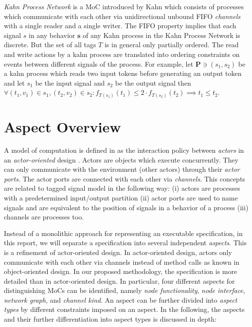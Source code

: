 \emph{Kahn Process Network} is a MoC introduced by Kahn \cite{kahn:1974}
which consists of processes which communicate with each other via
unidirectional unbound FIFO \emph{channels} with a  single reader and
a single writer. The FIFO property implies that each signal $s$ in any
behavior $\mathbf{s}$ of any Kahn process in the Kahn Process Network
is discrete.
But the set of all tags $T$ is in general only partially ordered.
The read and write actions by a kahn process are translated into
ordering constraints on events between different signals of the process.
For example, let $\mathbf{P} \ni (s_1,s_2)$ be a kahn process
which reads two input tokens before generating an output token and
let $s_1$ be the input signal and $s_2$ be the output signal then
$\forall{(t_1,v_1) \in s_1, (t_2,v_2) \in s_2}: f_{T(s_1)}(t_1) \le 2 \cdot f_{T(s_2)}(t_2) \implies t_1 \le t_2$.




\section{Aspect Overview}\label{aspect-overview}

A model of computation is defined in \cite{embsft:2002} as the
interaction policy between \emph{actors} in an \emph{actor-oriented} design
\cite{agha97abstracting:1997}. Actors are objects which execute concurrently. They can only
communicate with the environment (other actors) through their \emph{actor ports}.
The actor ports are connected with each other via \emph{channels}.
This concepts are related to tagged signal model in the following way:
(i) actors are processes with a predetermined input/output partition
(ii) actor ports are used to name signals and are equivalent to the position of signals in
a behavior of a process
(iii) channels are processes too.


Instead of a monolithic approach for representing an executable specification,
in this report, we will separate a specification into several
independent \emph{aspects}.
This is a refinement of actor-oriented design.
In actor-oriented design, actors only
communicate with each other via channels instead of method calls as known
in object-oriented design. In our proposed methodology, the specification is more
detailed than in actor-oriented design.
In particular, four different aspects for distinguishing MoCs can be identified,
namely \emph{node functionality}, \emph{node interface}, \emph{network graph}, and
\emph{channel kind}. An aspect can be further divided into
\emph{aspect types} by different constraints imposed on an aspect.
In the following, the aspects and their further
differentiation into aspect types is discussed in depth:


